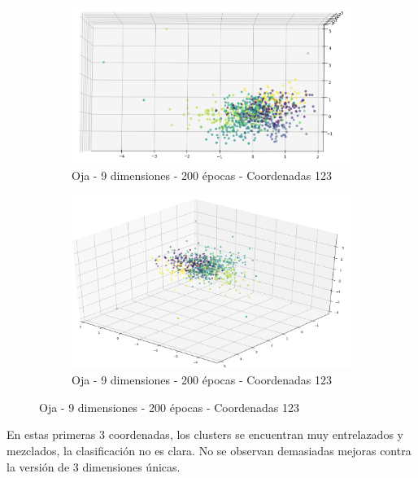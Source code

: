 \begin{figure}[!htbp]
\centering
\begin{subfigure}{.5\textwidth}
  \centering
  \includegraphics[width=1\linewidth, scale=1]{../img/ej1/oja_corrida_200_9/oja_9salida_200ep_testing_dim123_3.png}
  \caption{Oja - 9 dimensiones - 200 épocas - Coordenadas 123}
  \label{fig:sub1}
\end{subfigure}%
\begin{subfigure}{.5\textwidth}
  \centering
  \includegraphics[width=1\linewidth, scale=1]{../img/ej1/oja_corrida_200_9/oja_9salida_200ep_testing_dim123_4.png}
  \caption{Oja - 9 dimensiones - 200 épocas - Coordenadas 123}
  \label{fig:sub2}
\end{subfigure}
\end{figure}

\newpage

En estas primeras 3 coordenadas, los clusters se encuentran muy entrelazados y mezclados, la clasificación no es clara. No se observan demasiadas mejoras
contra la versión de 3 dimensiones únicas.

